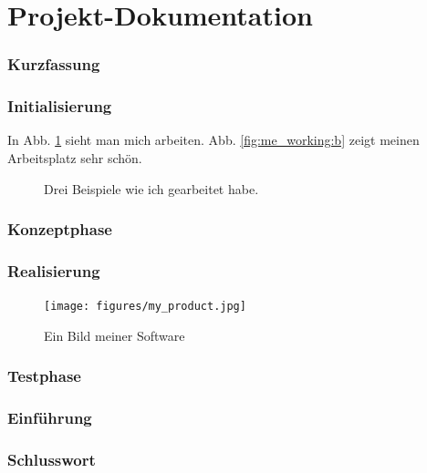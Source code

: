 \documentclass{article}
\begin{document}
\newpage
\part{Projekt-Dokumentation}
\newpage
\section{Kurzfassung}
\section{Initialisierung}
In Abb. \ref{fig:me_working} sieht man mich arbeiten. Abb. \ref{fig:me_working:b} zeigt meinen Arbeitsplatz sehr schön.
\begin{figure}[h!]
    \hfill
    \hfill
    \caption{Drei Beispiele wie ich gearbeitet habe.}
    \label{fig:me_working}
\end{figure}
\section{Konzeptphase}
\section{Realisierung}
\begin{figure}[h!]
    \centering
    \texttt{[image: figures/my\_product.jpg]}
    \caption{Ein Bild meiner Software}
    \label{fig:my_product}
\end{figure}
\section{Testphase}
\section{Einführung}
\section{Schlusswort}


\newpage

\setcounter{tocdepth}{1}
\listoffigures

\newpage
\printglossary[type=\acronymtype]
\newpage
\printglossary
\end{document}
